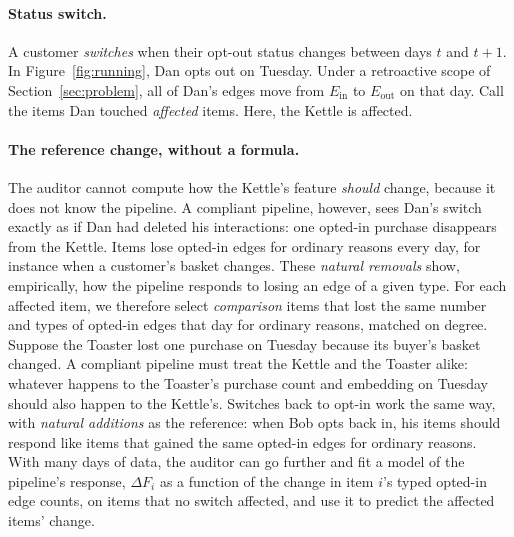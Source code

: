\documentclass[10pt,twocolumn,letterpaper]{article}
\theoremstyle{definition}
\newcommand{\Ein}{E_{\mathrm{in}}}
\newcommand{\Eout}{E_{\mathrm{out}}}
\begin{document}
\paragraph{Status switch.}
A customer \emph{switches} when their opt-out status changes between days $t$ and
$t{+}1$. In Figure~\ref{fig:running}, Dan opts out on Tuesday. Under a
retroactive scope of Section~\ref{sec:problem}, all of Dan's edges move from
$\Ein$ to $\Eout$ on that day. Call the items Dan touched \emph{affected} items.
Here, the Kettle is affected.

\paragraph{The reference change, without a formula.}
The auditor cannot compute how the Kettle's feature \emph{should} change,
because it does not know the pipeline. A compliant pipeline, however, sees
Dan's switch exactly as if Dan had deleted his interactions: one opted-in
purchase disappears from the Kettle. Items lose opted-in edges for ordinary
reasons every day, for instance when a customer's basket changes. These
\emph{natural removals} show, empirically, how the pipeline responds to losing
an edge of a given type. For each affected item, we therefore select
\emph{comparison} items that lost the same number and types of opted-in edges
that day for ordinary reasons, matched on degree. Suppose the Toaster lost one
purchase on Tuesday because its buyer's basket changed. A compliant pipeline
must treat the Kettle and the Toaster alike: whatever happens to the Toaster's
purchase count and embedding on Tuesday should also happen to the Kettle's.
Switches back to opt-in work the same way, with \emph{natural additions} as the
reference: when Bob opts back in, his items should respond like items that
gained the same opted-in edges for ordinary reasons. With many days of data,
the auditor can go further and fit a model of the pipeline's response,
$\Delta F_i$ as a function of the change in item $i$'s typed opted-in edge counts,
on items that no switch affected, and use it to predict the affected items'
change.
\end{document}
